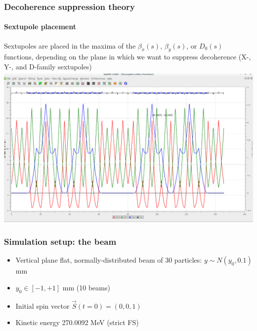 \documentclass{beamer}
\begin{document}
\begin{frame}\frametitle{Decoherence suppression theory}\framesubtitle{Sextupole placement}
  Sextupoles are placed in the maxima of the $\beta_x(s)$, $\beta_y(s)$, or $D_0(s)$ functions, depending on the plane in which we want to suppress decoherence (X-, Y-, and D-family sextupoles)
  \centering
  \includegraphics[width=\linewidth]{../img/Lattice/BNLFS_lattice_betas_optim}
\end{frame}

\begin{frame}\frametitle{Simulation setup: the beam}
  \begin{itemize}
  \item Vertical plane flat, normally-distributed beam of 30 particles: $y\sim N(y_0, 0.1)$ mm
  \item $y_0 \in [-1, +1]$ mm (10 beams)
  \item Initial spin vector $\vec S(t=0) = (0,0,1)$
  \item Kinetic energy 270.0092 MeV (strict FS)
  \end{itemize}
\end{frame}
\end{document}
